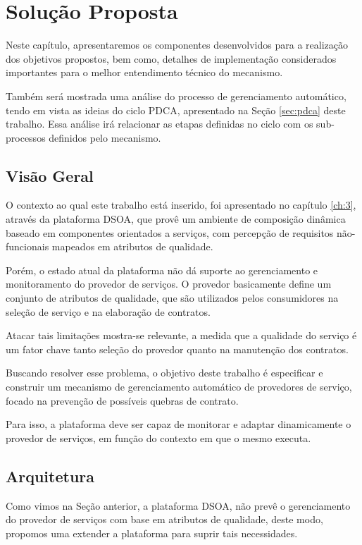 \chapter{Solução Proposta}
\label{ch:4}

Neste capítulo, apresentaremos os componentes desenvolvidos para a realização dos objetivos propostos, bem como, detalhes de implementação considerados importantes para o melhor entendimento técnico do mecanismo. 

Também será mostrada uma análise do processo de gerenciamento automático, tendo em vista as ideias do ciclo PDCA, apresentado na Seção \ref{sec:pdca} deste trabalho. Essa análise irá relacionar as etapas definidas no ciclo com os sub-processos definidos pelo mecanismo.

\section{Visão Geral}
O contexto ao qual este trabalho está inserido, foi apresentado no capítulo \ref{ch:3}, através da plataforma DSOA, que provê um ambiente de composição dinâmica baseado em componentes orientados a serviços, com percepção de requisitos não-funcionais mapeados em atributos de qualidade. 

Porém, o estado atual da plataforma não dá suporte ao gerenciamento e monitoramento do provedor de serviços. O provedor basicamente define um conjunto de atributos de qualidade, que são utilizados pelos consumidores na seleção de serviço e na elaboração de contratos.

Atacar tais limitações mostra-se relevante, a medida que a qualidade do serviço é um fator chave tanto seleção do provedor quanto na manutenção dos contratos.

Buscando resolver esse problema, o objetivo deste trabalho é especificar e construir um mecanismo de gerenciamento automático de provedores de serviço, focado na prevenção de possíveis quebras de contrato. 

Para isso, a plataforma deve ser capaz de monitorar e adaptar dinamicamente o provedor de serviços, em função do contexto em que o mesmo executa.


\section{Arquitetura}
\label{sec:arch_prop}

Como vimos na Seção anterior, a plataforma DSOA, não prevê o gerenciamento do provedor de serviços com base em atributos de qualidade, deste modo, propomos uma extender a plataforma para suprir tais necessidades.

